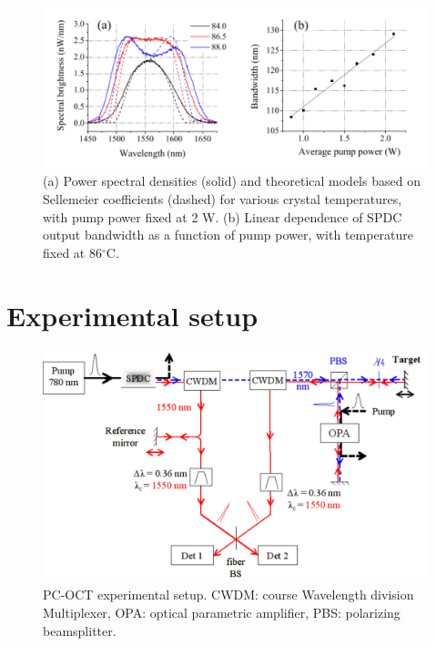\begin{figure}[t]
\begin{center}
\includegraphics[width=\textwidth]{figure-pcoct-data-spectrum.pdf}
\caption{(a) Power spectral densities (solid) and theoretical models based on Sellemeier coefficients (dashed) for various crystal temperatures, with pump power fixed at 2 W. (b) Linear dependence of SPDC output bandwidth as a function of pump power, with temperature fixed at 86$^\circ$C.}
\label{figure:pcoct-data-spectrum}
\end{center}
\end{figure}


\section{Experimental setup}

\begin{figure}[t]
\begin{center}
\includegraphics[width=16cm]{figure-pcoct-setup.pdf}
\caption{PC-OCT experimental setup. CWDM: course Wavelength division Multiplexer, OPA: optical parametric amplifier, PBS: polarizing beamsplitter.}
\label{figure:pcoct-setup}
\end{center}
\end{figure}

